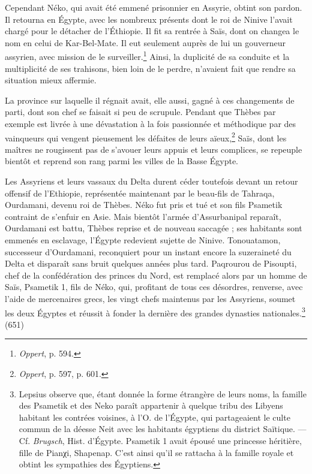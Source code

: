 \documentclass[a4paper, 11pt, oneside]{article}
\begin{document}
Cependant Néko, qui avait été emmené prisonnier en Assyrie, obtint son pardon. Il retourna en Égypte, avec les nombreux présents dont le roi de Ninive l'avait chargé pour le détacher de l'Éthiopie. Il fit sa rentrée à Saïs, dont on changea le nom en celui de Kar-Bel-Mate. Il eut seulement auprès de lui un gouverneur assyrien, avec mission de le surveiller.\footnote{\emph{Oppert}, p. 594.} Ainsi, la duplicité de sa conduite et la multiplicité de ses trahisons, bien loin de le perdre, n'avaient fait que rendre sa situation mieux affermie.

La province sur laquelle il régnait avait, elle aussi, gagné à ces changements de parti, dont son chef se faisait si peu de scrupule. Pendant que Thèbes par exemple est livrée à une dévastation à la fois passionnée et méthodique par des vainqueurs qui vengent pieusement les défaites de leurs aïeux,\footnote{\emph{Oppert}, p. 597, p. 601.} Saïs, dont les maîtres ne rougissent pas de s'avouer leurs appuis et leurs complices, se repeuple bientôt et reprend son rang parmi les villes de la Basse Égypte.

Les Assyriens et leurs vassaux du Delta durent céder toutefois devant un retour offensif de l'Ethiopie, représentée maintenant par le beau-fils de Tahraqa, Ourdamani, devenu roi de Thèbes. Néko fut pris et tué et son fils Psametik contraint de s'enfuir en Asie. Mais bientôt l'armée d'Assurbanipal reparaît, Ourdamani est battu, Thèbes reprise et de nouveau saccagée ; ses habitants sont emmenés en esclavage, l'Égypte redevient sujette de Ninive. Tonouatamon, successeur d'Ourdamani, reconquiert pour un instant encore la suzeraineté du Delta et disparaît sans bruit quelques années plus tard. Paqrourou de Pisoupti, chef de la confédération des princes du Nord, est remplacé alors par un homme de Saïs, Psametik 1, fils de Néko, qui, profitant de tous ces désordres, renverse, avec l'aide de mercenaires grecs, les vingt chefs maintenus par les Assyriens, soumet les deux Égyptes et réussit à fonder la dernière des grandes dynasties nationales.\footnote{Lepsius observe que, étant donnée la forme étrangère de leurs noms, la famille des Psametik et des Neko paraît appartenir à quelque tribu des Libyens habitant les contrées voisines, à l'O. de l'Égypte, qui partageaient le culte commun de la déesse Neit avec les habitants égyptiens du district Saïtique. --- Cf. \emph{Brugsch}, Hist. d'Égypte. Psametik 1 avait épousé une princesse héritière, fille de Pianχi, Shapenap. C'est ainsi qu'il se rattacha à la famille royale et obtint les sympathies des Égyptiens.} (651)
\end{document}
